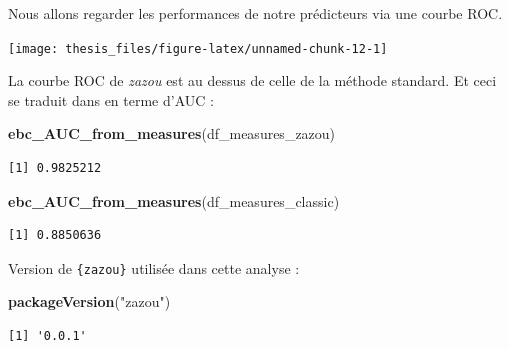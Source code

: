 \documentclass[12pt,a4paper]{reedthesis}
\newenvironment{Shaded}{\begin{snugshade}}{\end{snugshade}}
\newcommand{\DataTypeTok}[1]{\textcolor[rgb]{0.13,0.29,0.53}{#1}}
\newcommand{\KeywordTok}[1]{\textcolor[rgb]{0.13,0.29,0.53}{\textbf{#1}}}
\newcommand{\NormalTok}[1]{#1}
\newcommand{\OperatorTok}[1]{\textcolor[rgb]{0.81,0.36,0.00}{\textbf{#1}}}
\newcommand{\StringTok}[1]{\textcolor[rgb]{0.31,0.60,0.02}{#1}}
\theoremstyle{definition}
\theoremstyle{definition}
\theoremstyle{definition}
\theoremstyle{remark}
\begin{document}
Nous allons regarder les performances de notre prédicteurs via une courbe ROC.
\begin{Shaded}
\end{Shaded}
\begin{center}\texttt{[image: thesis\_files/figure-latex/unnamed-chunk-12-1]} \end{center}

La courbe ROC de \emph{zazou} est au dessus de celle de la méthode standard. Et ceci se traduit dans en terme d'AUC :
\begin{Shaded}
\begin{Highlighting}[]
\KeywordTok{ebc_AUC_from_measures}\NormalTok{(df_measures_zazou)}
\end{Highlighting}
\end{Shaded}
\begin{verbatim}
[1] 0.9825212
\end{verbatim}
\begin{Shaded}
\begin{Highlighting}[]
\KeywordTok{ebc_AUC_from_measures}\NormalTok{(df_measures_classic)}
\end{Highlighting}
\end{Shaded}
\begin{verbatim}
[1] 0.8850636
\end{verbatim}
Version de \texttt{\{zazou\}} utilisée dans cette analyse :
\begin{Shaded}
\begin{Highlighting}[]
\KeywordTok{packageVersion}\NormalTok{(}\StringTok{"zazou"}\NormalTok{)}
\end{Highlighting}
\end{Shaded}
\begin{verbatim}
[1] '0.0.1'
\end{verbatim}
\backmatter
\end{document}
